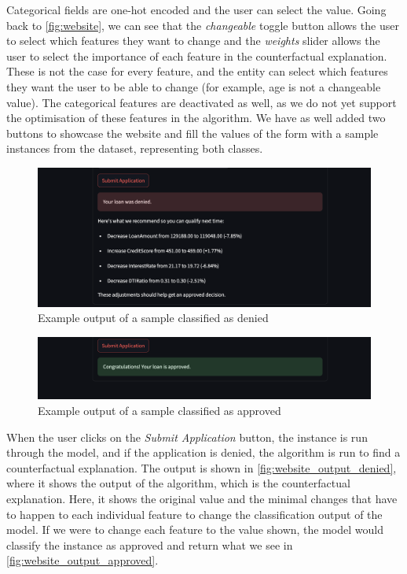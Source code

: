 \documentclass[12pt]{extarticle}
\numberwithin{equation}{section}
\begin{document}
Categorical fields are one-hot encoded and the user can select the value. Going back to \autoref{fig:website}, we can see that the \emph{changeable} toggle button allows the user to select which features they want to change and the \emph{weights} slider allows the user to select the importance of each feature in the counterfactual explanation. These is not the case for every feature, and the entity can select which features they want the user to be able to change (for example, age is not a changeable value). The categorical features are deactivated as well, as we do not yet support the optimisation of these features in the algorithm. We have as well added two buttons to showcase the website and fill the values of the form with a sample instances from the dataset, representing both classes.

\begin{figure}[H]
    \centering
    \includegraphics[width=1\textwidth]{images/website_output_denied}
    \caption{Example output of a sample classified as denied}
    \label{fig:website_output_denied}
\end{figure}
\begin{figure}[H]
    \centering
    \includegraphics[width=1\textwidth]{images/website_output_approved}
    \caption{Example output of a sample classified as approved}
    \label{fig:website_output_approved}
\end{figure}

When the user clicks on the \emph{Submit Application} button, the instance is run through the model, and if the application is denied, the algorithm is run to find a counterfactual explanation. The output is shown in \autoref{fig:website_output_denied}, where it shows the output of the algorithm, which is the counterfactual explanation. Here, it shows the original value and the minimal changes that have to happen to each individual feature to change the classification output of the model. If we were to change each feature to the value shown, the model would classify the instance as approved and return what we see in \autoref{fig:website_output_approved}.
\end{document}
